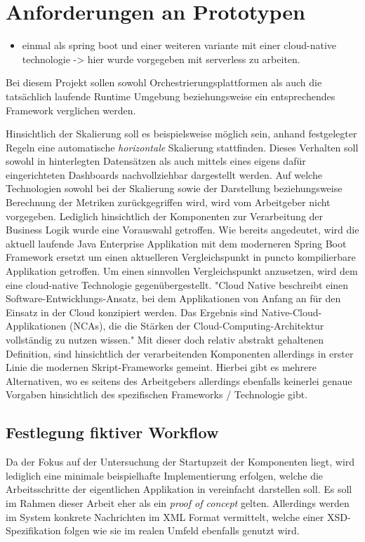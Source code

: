 \section{Anforderungen an Prototypen}
\begin{itemize}
  \item einmal als spring boot und einer weiteren variante mit einer cloud-native technologie -> hier wurde vorgegeben mit serverless zu arbeiten.
\end{itemize}

Bei diesem Projekt sollen sowohl Orchestrierungsplattformen als auch die tatsächlich laufende Runtime Umgebung beziehungsweise ein entsprechendes Framework verglichen werden. 

Hinsichtlich der Skalierung soll es beispielsweise möglich sein, anhand festgelegter Regeln eine automatische \emph{horizontale} Skalierung stattfinden. Dieses Verhalten soll sowohl in hinterlegten Datensätzen als auch mittels eines eigens dafür eingerichteten Dashboards nachvollziehbar dargestellt werden. Auf welche Technologien sowohl bei der Skalierung sowie der Darstellung beziehungsweise Berechnung der Metriken zurückgegriffen wird, wird vom Arbeitgeber nicht vorgegeben. Lediglich hinsichtlich der Komponenten zur Verarbeitung der Business Logik wurde eine Vorauswahl getroffen. Wie bereits angedeutet, wird die aktuell laufende Java Enterprise Applikation mit dem moderneren Spring Boot Framework ersetzt um einen aktuelleren Vergleichspunkt in puncto kompilierbare Applikation getroffen. Um einen sinnvollen Vergleichspunkt anzusetzen, wird dem eine cloud-native Technologie gegenübergestellt. "Cloud Native beschreibt einen Software-Entwicklungs-Ansatz, bei dem Applikationen von Anfang an für den Einsatz in der Cloud konzipiert werden. Das Ergebnis sind Native-Cloud-Applikationen (NCAs), die die Stärken der Cloud-Computing-Architektur vollständig zu nutzen wissen." \cite{cn-def} Mit dieser doch relativ abstrakt gehaltenen Definition, sind hinsichtlich der verarbeitenden Komponenten allerdings in erster Linie die modernen Skript-Frameworks gemeint. Hierbei gibt es mehrere Alternativen, wo es seitens des Arbeitgebers allerdings ebenfalls keinerlei genaue Vorgaben hinsichtlich des spezifischen Frameworks / Technologie gibt.

\subsection{Festlegung fiktiver Workflow}
\label{ss:fiktiverWorkflow}
Da der Fokus auf der Untersuchung der Startupzeit der Komponenten liegt, wird lediglich eine minimale beispielhafte Implementierung erfolgen, welche die Arbeitsschritte der eigentlichen Applikation in vereinfacht darstellen soll. Es soll im Rahmen dieser Arbeit eher als ein \emph{proof of concept} gelten. Allerdings werden im System konkrete Nachrichten im XML Format vermittelt, welche einer XSD-Spezifikation folgen wie sie im realen Umfeld ebenfalls genutzt wird. 

